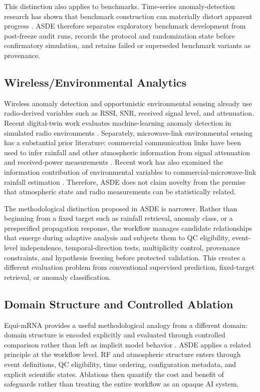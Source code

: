 \documentclass{ieeeaccess}
\begin{document}
This distinction also applies to benchmarks. Time-series anomaly-detection research has shown that benchmark construction can materially distort apparent progress \cite{TSAD-BENCHMARKS-2023}. ASDE therefore separates exploratory benchmark development from post-freeze audit runs, records the protocol and randomization state before confirmatory simulation, and retains failed or superseded benchmark variants as provenance.

\subsection{Wireless/Environmental Analytics}\label{wirelessenvironmental-analytics}

Wireless anomaly detection and opportunistic environmental sensing already use radio-derived variables such as RSSI, SNR, received signal level, and attenuation. Recent digital-twin work evaluates machine-learning anomaly detection in simulated radio environments \cite{RADIO-DT-2025}. Separately, microwave-link environmental sensing has a substantial prior literature: commercial communication links have been used to infer rainfall and other atmospheric information from signal attenuation and received-power measurements \cite{MESSER-2006,LEIJNSE-2007,UIJLENHOET-2018}. Recent work has also examined the information contribution of environmental variables to commercial-microwave-link rainfall estimation \cite{SPACKOVA-2025}. Therefore, ASDE does not claim novelty from the premise that atmospheric state and radio measurements can be statistically related.

The methodological distinction proposed in ASDE is narrower. Rather than beginning from a fixed target such as rainfall retrieval, anomaly class, or a prespecified propagation response, the workflow manages candidate relationships that emerge during adaptive analysis and subjects them to QC eligibility, event-level independence, temporal-direction tests, multiplicity control, provenance constraints, and hypothesis freezing before protected validation. This creates a different evaluation problem from conventional supervised prediction, fixed-target retrieval, or anomaly classification.

\subsection{Domain Structure and Controlled Ablation}\label{domain-structure-and-controlled-ablation}

Equi-mRNA provides a useful methodological analogy from a different domain: domain structure is encoded explicitly and evaluated through controlled comparison rather than left as implicit model behavior \cite{EQUI-MRNA-2025}. ASDE applies a related principle at the workflow level. RF and atmospheric structure enters through event definitions, QC eligibility, time ordering, configuration metadata, and explicit scientific states. Ablations then quantify the cost and benefit of safeguards rather than treating the entire workflow as an opaque AI system.
\end{document}
